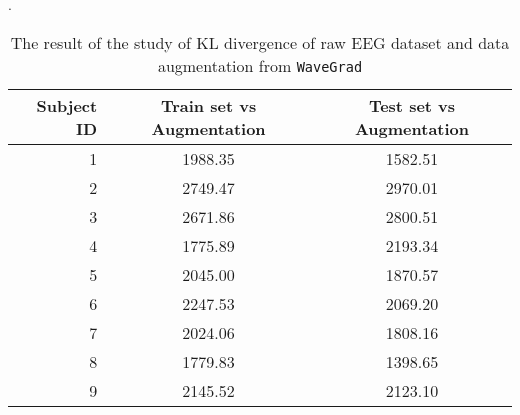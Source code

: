 \begin{table}[]
    \caption[The result of KL divergence]{\label{tab:KL2}The result of the study of KL divergence of raw EEG dataset and data augmentation from \texttt{WaveGrad}}.
    \begin{indented}
    \item[]\begin{tabular}{rcc}
    \hline
    Subject ID & \multicolumn{1}{c}{Train set vs Augmentation} & \multicolumn{1}{c}{Test set vs Augmentation} \\ \hline
    1          & 1988.35                                        & 1582.51                                       \\
    2          & 2749.47                                        & 2970.01                                       \\
    3          & 2671.86                                        & 2800.51                                       \\
    4          & 1775.89                                        & 2193.34                                       \\
    5          & 2045.00                                        & 1870.57                                       \\
    6          & 2247.53                                        & 2069.20                                       \\
    7          & 2024.06                                        & 1808.16                                       \\
    8          & 1779.83                                        & 1398.65                                       \\
    9          & 2145.52                                        & 2123.10                                      
    \end{tabular}
    \end{indented}
\end{table}